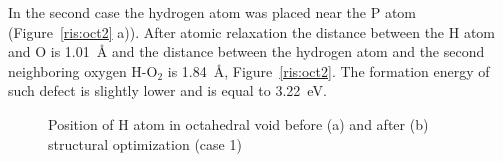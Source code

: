 In the second case the hydrogen atom was placed near the P atom (Figure~\ref{ris:oct2} a)). After atomic  relaxation the distance between the H atom and O is 1.01{~\AA} and the distance between the hydrogen atom and the second neighboring oxygen H-O$_2$ is 1.84{~\AA}, Figure~\ref{ris:oct2}. The formation energy of such defect is slightly lower and is equal to 3.22~eV.


\begin{figure}[ht]
\begin{minipage}[ht]{0.49\linewidth}
\end{minipage}
\hfill
\begin{minipage}[ht]{0.49\linewidth}
\end{minipage}
\caption{Position of H atom in octahedral void before (a) and after (b) structural optimization (case 1)}
\label{ris:oct1}
\end{figure}

